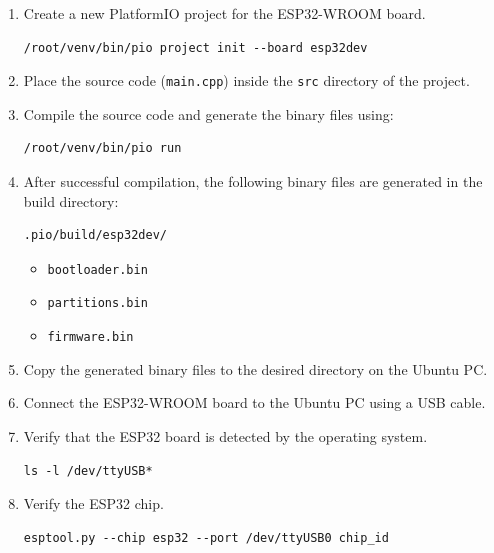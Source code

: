 \documentclass[12pt,a4paper]{article}
\begin{document}
\begin{enumerate}

\item Create a new PlatformIO project for the ESP32-WROOM board.

\begin{verbatim}
/root/venv/bin/pio project init --board esp32dev
\end{verbatim}

\item Place the source code (\texttt{main.cpp}) inside the \texttt{src} directory of the project.

\item Compile the source code and generate the binary files using:

\begin{verbatim}
/root/venv/bin/pio run
\end{verbatim}

\item After successful compilation, the following binary files are generated in the build directory:

\begin{verbatim}
.pio/build/esp32dev/
\end{verbatim}

\begin{itemize}
    \item \texttt{bootloader.bin}
    \item \texttt{partitions.bin}
    \item \texttt{firmware.bin}
\end{itemize}

\item Copy the generated binary files to the desired directory on the Ubuntu PC.

\item Connect the ESP32-WROOM board to the Ubuntu PC using a USB cable.

\item Verify that the ESP32 board is detected by the operating system.

\begin{verbatim}
ls -l /dev/ttyUSB*
\end{verbatim}

\item Verify the ESP32 chip.

\begin{verbatim}
esptool.py --chip esp32 --port /dev/ttyUSB0 chip_id
\end{verbatim}


\end{enumerate}
\end{document}

